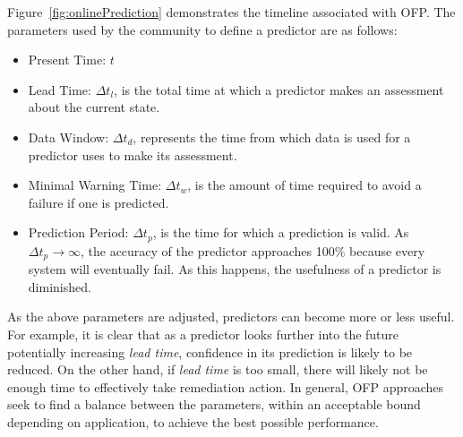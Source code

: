 \figonlinePrediction

Figure~\ref{fig:onlinePrediction} demonstrates the timeline associated with
OFP.  The parameters used by the community to define a predictor are as
follows:
\begin{itemize}
	\item{Present Time: $t$}
  \item{Lead Time: $\Delta t_{l}$, is the total time at which a predictor makes
  an assessment about the current state.}
  \item{Data Window: $\Delta t_{d}$, represents the time from which data is
  used for a predictor uses to make its assessment.}
  \item{Minimal Warning Time: $\Delta t_{w}$, is the amount of time required to
  avoid a failure if one is predicted.}
  \item{Prediction Period: $\Delta t_{p}$, is the time for which a prediction
  is valid.  As $\Delta t_{p} \rightarrow \infty$, the accuracy of the
  predictor approaches 100\% because every system will eventually fail.  As
  this happens, the usefulness of a predictor is diminished.}
\end{itemize}

As the above parameters are adjusted, predictors can become more or less
useful.  For example, it is clear that as a predictor looks further into the
future potentially increasing \emph{lead time}, confidence in its prediction is
likely to be reduced.  On the other hand, if \emph{lead time} is too small,
there will likely not be enough time to effectively take remediation action.
In general, OFP approaches seek to find a balance between the parameters,
within an acceptable bound depending on application, to achieve the best
possible performance.
